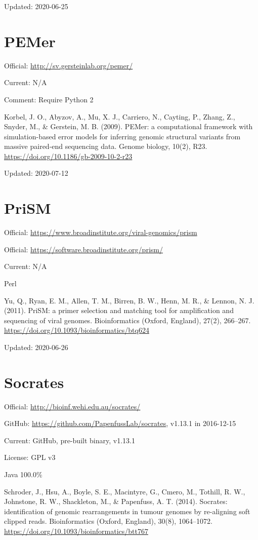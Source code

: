 \documentclass[]{article}
\begin{document}
Updated: 2020-06-25

\section{PEMer}

Official: \url{http://sv.gersteinlab.org/pemer/}

Current: N/A

Comment: Require Python 2

Korbel, J. O., Abyzov, A., Mu, X. J., Carriero, N., Cayting, P., Zhang, Z., Snyder, M., \& Gerstein, M. B. (2009). PEMer: a computational framework with simulation-based error models for inferring genomic structural variants from massive paired-end sequencing data. Genome biology, 10(2), R23. \url{https://doi.org/10.1186/gb-2009-10-2-r23}

Updated: 2020-07-12

\section{PriSM}

Official: \url{https://www.broadinstitute.org/viral-genomics/prism}

Official: \url{https://software.broadinstitute.org/prism/}

Current: N/A

Perl

Yu, Q., Ryan, E. M., Allen, T. M., Birren, B. W., Henn, M. R., \& Lennon, N. J. (2011). PriSM: a primer selection and matching tool for amplification and sequencing of viral genomes. Bioinformatics (Oxford, England), 27(2), 266–267. \url{https://doi.org/10.1093/bioinformatics/btq624}

Updated: 2020-06-26

\section{Socrates}

Official: \url{http://bioinf.wehi.edu.au/socrates/}

GitHub: \url{https://github.com/PapenfussLab/socrates}, v1.13.1 in 2016-12-15

Current: GitHub, pre-built binary, v1.13.1

License: GPL v3

Java 100.0\%

Schroder, J., Hsu, A., Boyle, S. E., Macintyre, G., Cmero, M., Tothill, R. W., Johnstone, R. W., Shackleton, M., \& Papenfuss, A. T. (2014). Socrates: identification of genomic rearrangements in tumour genomes by re-aligning soft clipped reads. Bioinformatics (Oxford, England), 30(8), 1064–1072. \url{https://doi.org/10.1093/bioinformatics/btt767}
\end{document}
